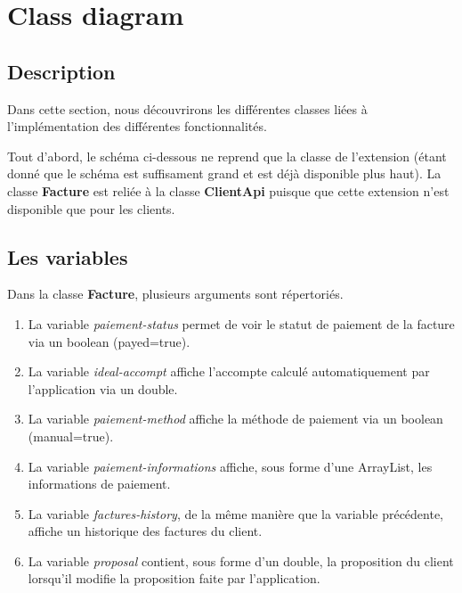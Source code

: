 \section{Class diagram}
\subsection{Description}
\begin{flushleft}
Dans cette section, nous découvrirons les différentes classes liées à l'implémentation des différentes fonctionnalités.
\end{flushleft}

\begin{flushleft}
Tout d'abord, le schéma ci-dessous ne reprend que la classe de l'extension (étant donné que le schéma est suffisament grand et est déjà disponible plus haut). La classe \textbf{Facture} est reliée à la classe \textbf{ClientApi} puisque que cette extension n'est disponible que pour les clients.
\end{flushleft}

\subsection{Les variables}
\begin{flushleft}
Dans la classe \textbf{Facture}, plusieurs arguments sont répertoriés.
\end{flushleft}

\begin{enumerate}[-]

\item La variable \emph{paiement-status} permet de voir le statut de paiement de la facture via un boolean (payed=true).

\item La variable \emph{ideal-accompt} affiche l'accompte calculé automatiquement par l'application via un double.

\item La variable \emph{paiement-method} affiche la méthode de paiement via un boolean (manual=true).

\item La variable \emph{paiement-informations} affiche, sous forme d'une ArrayList, les informations de paiement.

\item La variable \emph{factures-history}, de la même manière que la variable précédente, affiche un historique des factures du client.

\item La variable \emph{proposal} contient, sous forme d'un double, la proposition du client lorsqu'il modifie la proposition faite par l'application.

\end{enumerate}

